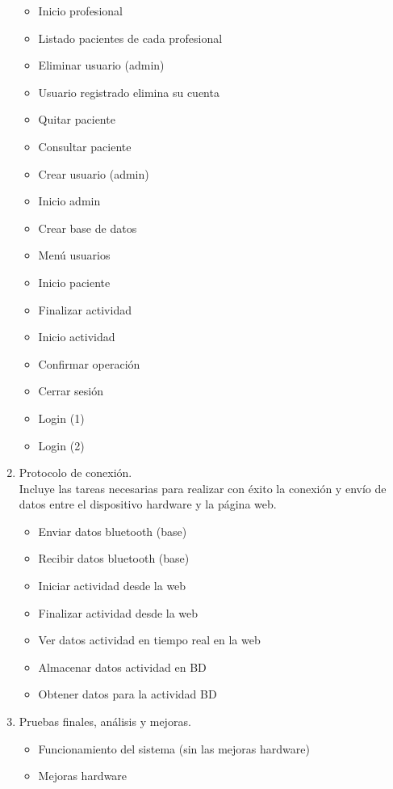 \begin{enumerate}
\begin{itemize}
        \item Inicio profesional
        \item Listado pacientes de cada profesional
        \item Eliminar usuario (admin)
        \item Usuario registrado elimina su cuenta
        \item Quitar paciente
        \item Consultar paciente
        \item Crear usuario (admin)
        \item Inicio admin
        \item Crear base de datos
        \item Menú usuarios
        \item Inicio paciente
        \item Finalizar actividad
        \item Inicio actividad
        \item Confirmar operación
        \item Cerrar sesión
        \item Login (1)
        \item Login (2)
    \end{itemize}
    \item Protocolo de conexión.\\
    Incluye las tareas necesarias para realizar con éxito la conexión y envío de datos entre el dispositivo hardware y la página web.
    \begin{itemize}
        \item Enviar datos bluetooth (base)
        \item Recibir datos bluetooth (base)
        \item Iniciar actividad desde la web
        \item Finalizar actividad desde la web
        \item Ver datos actividad en tiempo real en la web
        \item Almacenar datos actividad en BD
        \item Obtener datos para la actividad BD
    \end{itemize}
    \item Pruebas finales, análisis y mejoras.
    \begin{itemize}
        \item Funcionamiento del sistema (sin las mejoras hardware)
        \item Mejoras hardware

\end{itemize}
\end{enumerate}
